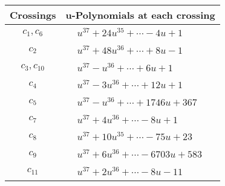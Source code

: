 \documentclass[1p]{elsarticle_modified}
\theoremstyle{definition}
\begin{document}
\begin{tabular}{m{50pt}|m{274pt}}
Crossings & \hspace{64pt}u-Polynomials at each crossing \\
\hline $$\begin{aligned}c_{1},c_{6}\end{aligned}$$&$\begin{aligned}
&u^{37}+24 u^{35}+\cdots-4 u+1
\end{aligned}$\\
\hline $$\begin{aligned}c_{2}\end{aligned}$$&$\begin{aligned}
&u^{37}+48 u^{36}+\cdots+8 u-1
\end{aligned}$\\
\hline $$\begin{aligned}c_{3},c_{10}\end{aligned}$$&$\begin{aligned}
&u^{37}- u^{36}+\cdots+6 u+1
\end{aligned}$\\
\hline $$\begin{aligned}c_{4}\end{aligned}$$&$\begin{aligned}
&u^{37}-3 u^{36}+\cdots+12 u+1
\end{aligned}$\\
\hline $$\begin{aligned}c_{5}\end{aligned}$$&$\begin{aligned}
&u^{37}- u^{36}+\cdots+1746 u+367
\end{aligned}$\\
\hline $$\begin{aligned}c_{7}\end{aligned}$$&$\begin{aligned}
&u^{37}+4 u^{36}+\cdots-8 u+1
\end{aligned}$\\
\hline $$\begin{aligned}c_{8}\end{aligned}$$&$\begin{aligned}
&u^{37}+10 u^{35}+\cdots-75 u+23
\end{aligned}$\\
\hline $$\begin{aligned}c_{9}\end{aligned}$$&$\begin{aligned}
&u^{37}+6 u^{36}+\cdots-6703 u+583
\end{aligned}$\\
\hline $$\begin{aligned}c_{11}\end{aligned}$$&$\begin{aligned}
&u^{37}+2 u^{36}+\cdots-8 u-11
\end{aligned}$\\
\hline
\end{tabular}\\~\\
\end{document}
